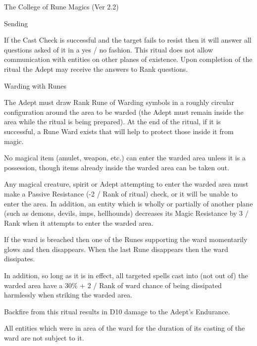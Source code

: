 \begin{Chapter}{The College of Rune Magics (Ver 2.2)}
\begin{ritual}[Q-3]{Sending}
\begin{effects}
If the Cast Check is successful and the target fails to resist then it
will answer all questions asked of it in a yes / no fashion.  This
ritual does not allow communication with entities on other planes of
existence. Upon completion of the ritual the Adept may receive the
answers to Rank questions.
\end{effects}
\end{ritual}

\begin{ritual}[Q-4]{Warding with Runes}

\begin{effects}
The Adept must draw Rank Rune of Warding symbols in a roughly circular
configuration around the area to be warded (the Adept must remain
inside the area while the ritual is being prepared). At the end of the
ritual, if it is successful, a Rune Ward exists that will help to
protect those inside it from magic.

No magical item (amulet, weapon, etc.)  can enter the warded area
unless it is a possession, though items already inside the warded area
can be taken out.

Any magical creature, spirit or Adept attempting to enter the warded
area must make a Passive Resistance (-2 / Rank of ritual) check, or it
will be unable to enter the area.  In addition, an entity which is
wholly or partially of another plane (such as demons, devils, imps,
hellhounds) decreases its Magic Resistance by 3 / Rank when it
attempts to enter the warded area.

If the ward is breached then one of the Runes supporting the ward
momentarily glows and then disappears. When the last Rune disappears
then the ward dissipates.

In addition, so long as it is in effect, all targeted spells cast into
(not out of) the warded area have a 30\% + 2 / Rank of ward chance of
being dissipated harmlessly when striking the warded area.

Backfire from this ritual results in D10 damage to the Adept’s
Endurance.

All entities which were in area of the ward for the duration of its
casting of the ward are not subject to it.
\end{effects}
\end{ritual}



\end{Chapter}
